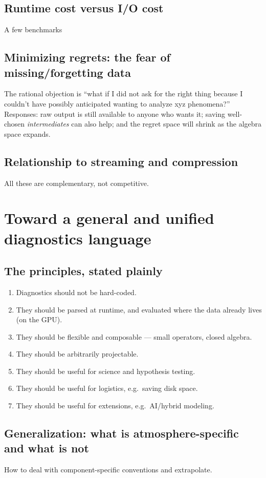 \documentclass[gmd, manuscript]{copernicus}
\begin{document}
\subsection{Runtime cost versus I/O cost}
A few benchmarks

\subsection{Minimizing regrets: the fear of missing/forgetting data}
The rational objection is ``what if I did not ask for the right thing because I couldn't have possibly anticipated wanting to analyze xyz phenomena?''
Responses: raw output is still available to anyone who wants it; saving well-chosen \emph{intermediates} can also help; and the regret space will shrink as the algebra space expands.

\subsection{Relationship to streaming and compression}
All these are complementary, not competitive.


\section{Toward a general and unified diagnostics language}

\subsection{The principles, stated plainly}

\begin{enumerate}
  \item Diagnostics should not be hard-coded.
  \item They should be parsed at runtime, and evaluated where the data already lives (on the GPU).
  \item They should be flexible and composable --- small operators, closed algebra.
  \item They should be arbitrarily projectable.
  \item They should be useful for science and hypothesis testing.
  \item They should be useful for logistics, e.g.\ saving disk space.
  \item They should be useful for extensions, e.g.\ AI/hybrid modeling.
\end{enumerate}

\subsection{Generalization: what is atmosphere-specific and what is not}
How to deal with component-specific conventions and extrapolate.
\end{document}
